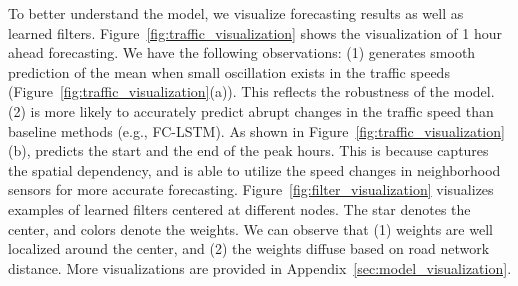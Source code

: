To better understand the model, we visualize forecasting results as well as learned filters. 
Figure~\ref{fig:traffic_visualization} shows the visualization of 1 hour ahead forecasting. We have the following observations:
(1) \gcrnn{} generates smooth prediction of the mean when small oscillation exists in the traffic speeds (Figure~\ref{fig:traffic_visualization}(a)). 
This reflects the robustness of the model.
(2) \gcrnn{} is more likely to accurately predict abrupt changes in the traffic speed than baseline methods (e.g., FC-LSTM).
As shown in Figure~\ref{fig:traffic_visualization}(b), \gcrnn{} predicts the start and the end of the peak hours. This is because \gcrnn{} captures the spatial dependency, and is able to utilize the speed changes in neighborhood sensors for more accurate forecasting. 
Figure~\ref{fig:filter_visualization} visualizes examples of learned filters centered at different nodes. The star denotes the center, and colors denote the weights. We can observe that (1) weights are well localized around the center, and (2) the weights diffuse based on road network distance. 
More visualizations are provided in Appendix~\ref{sec:model_visualization}.